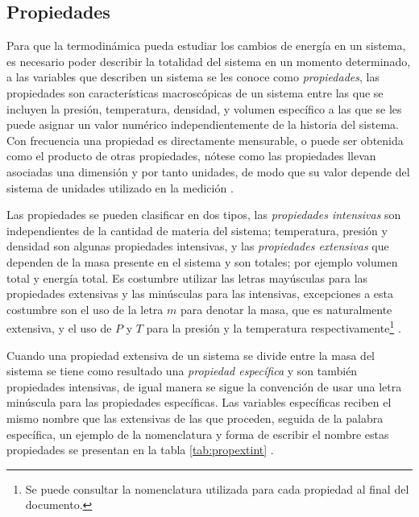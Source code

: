 \documentclass[../master.tex]{subfiles}
\begin{document}
\subsection{Propiedades}

Para que la termodinámica pueda estudiar los cambios de energía en un sistema, es necesario poder describir la totalidad del sistema en un momento determinado, a las variables que describen un sistema se les conoce como \emph{propiedades}, las propiedades son características macroscópicas de un sistema entre las que se incluyen la presión, temperatura, densidad, y volumen específico a las que se les puede asignar un valor numérico independientemente de la historia del sistema. Con frecuencia una propiedad es directamente mensurable, o puede ser obtenida como el producto de otras propiedades, nótese como las propiedades llevan asociadas una dimensión y por tanto unidades, de modo que su valor depende del sistema de unidades utilizado en la medición \parencites{moranshapiro}{faires}{wark}.

Las propiedades se pueden clasificar en dos tipos, las \emph{propiedades intensivas} son independientes de la cantidad de materia del sistema; temperatura, presión y densidad son algunas propiedades intensivas, y las \emph{propiedades extensivas} que dependen de la masa presente en el sistema y son totales; por ejemplo volumen total y energía total. Es costumbre utilizar las letras mayúsculas para las propiedades extensivas y las minúsculas para las intensivas, excepciones a esta costumbre son el uso de la letra \( m \) para denotar la masa, que es naturalmente extensiva, y el uso de \( P \) y \( T \) para la presión y la temperatura respectivamente\footnote{Se puede consultar la nomenclatura utilizada para cada propiedad al final del documento.} \parencites{wark}{faires}{cengelt}.

Cuando una propiedad extensiva de un sistema se divide entre la masa del sistema se tiene como resultado una \emph{propiedad específica} y son también propiedades intensivas, de igual manera se sigue la convención de usar una letra minúscula para las propiedades específicas. Las variables específicas reciben el mismo nombre que las extensivas de las que proceden, seguida de la palabra específica, un ejemplo de la nomenclatura y forma de escribir el nombre estas propiedades se presentan en la tabla \ref{tab:propextint} \parencite{wark}.
\end{document}
